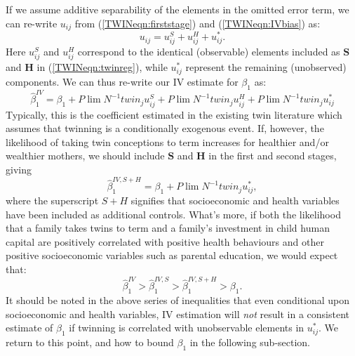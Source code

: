 If we assume additive separability of the elements in the omitted error term, we
can re-write $u_{ij}$ from (\ref{TWINeqn:firststage}) and (\ref{TWINeqn:IVbias}) 
as:
\[ u_{ij}=u^S_{ij}+u^H_{ij}+u^*_{ij}. \]
Here $u^S_{ij}$ and $u^H_{ij}$ correspond to the identical (observable) elements
included as $\bm{S}$ and $\bm{H}$ in (\ref{TWINeqn:twinreg}), while $u^*_{ij}$
represent the remaining (unobserved) components.  We can thus re-write our IV
estimate for $\beta_1$ as:
\begin{equation}
\label{TWINeqn:betabias}
\hat\beta_1^{IV} = \beta_1 + P\lim N^{-1}twin_ju^S_{ij} + 
P\lim N^{-1}twin_ju^H_{ij} + P\lim N^{-1}twin_ju^*_{ij}
\end{equation}
Typically, this is the coefficient estimated in the existing twin literature 
which assumes that twinning is a conditionally exogenous event.  If, however, the 
likelihood of taking twin conceptions to term increases for healthier and/or 
wealthier mothers, we should include $\bm{S}$ and $\bm{H}$ in the first and 
second stages, giving
\begin{equation}
\label{TWINeqn:betacloser}
\hat\beta_1^{IV,S+H} = \beta_1 + P\lim N^{-1}twin_ju^*_{ij},
\end{equation}
where the superscript $S+H$ signifies that socioeconomic and health variables 
have been included as additional controls.  What's more, if both the likelihood
that a family takes twins to term and a family's investment in child human capital 
are positively correlated with positive health behaviours and other positive 
socioeconomic variables such as parental education, we would expect that:
\[
\hat\beta_1^{IV}>\hat\beta_1^{IV,S}>\hat\beta_1^{IV,S+H}>\beta_1.
\]
It should be noted in the above series of inequalities that even conditional upon
socioeconomic and health variables, IV estimation will \emph{not} result in a
consistent estimate of $\beta_1$ if twinning is correlated with unobservable
elements in $u^*_{ij}$.  We return to this point, and how to bound $\beta_1$ in
the following sub-section.

